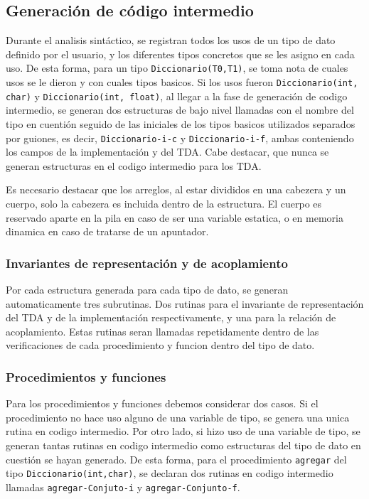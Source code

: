 \subsection{Generación de código intermedio}
Durante el analisis sintáctico, se registran todos los usos de un tipo de dato
definido por el usuario, y los diferentes tipos concretos que se les asigno en
cada uso. De esta forma, para un tipo \texttt{Diccionario(T0,T1)}, se toma nota de
cuales usos se le dieron y con cuales tipos basicos. Si los usos fueron
\texttt{Diccionario(int, char)} y \texttt{Diccionario(int, float)}, al llegar a la fase de
generación de codigo intermedio, se generan dos estructuras de bajo nivel
llamadas con el nombre del tipo en cuentión seguido de las iniciales de los
tipos basicos utilizados separados por guiones, es decir,
\texttt{Diccionario-i-c} y \texttt{Diccionario-i-f}, ambas conteniendo los
campos de la implementación y del TDA. Cabe destacar, que nunca se generan
estructuras en el codigo intermedio para los TDA.

Es necesario destacar que los arreglos, al estar divididos en una cabezera y
un cuerpo, solo la cabezera es incluida dentro de la estructura. El cuerpo es
reservado aparte en la pila en caso de ser una variable estatica, o en memoria
dinamica en caso de tratarse de un apuntador.

\subsubsection{Invariantes de representación y de acoplamiento}
Por cada estructura generada para cada tipo de dato, se generan
automaticamente tres subrutinas. Dos rutinas para el invariante de
representación del TDA y de la implementación respectivamente, y una para la
relación de acoplamiento. Estas rutinas seran llamadas repetidamente dentro de
las verificaciones de cada procedimiento y funcion dentro del tipo de dato.

\subsubsection{Procedimientos y funciones}
Para los procedimientos y funciones debemos considerar dos casos. Si el
procedimiento no hace uso alguno de una variable de tipo, se genera una unica
rutina en codigo intermedio. Por otro lado, si hizo uso de una variable de
tipo, se generan tantas rutinas en codigo intermedio como estructuras del tipo
de dato en cuestión se hayan generado. De esta forma, para el procedimiento \texttt{agregar} del tipo \texttt{Diccionario(int,char)}, se declaran dos rutinas en codigo intermedio llamadas
\texttt{agregar-Conjuto-i} y \texttt{agregar-Conjunto-f}.

